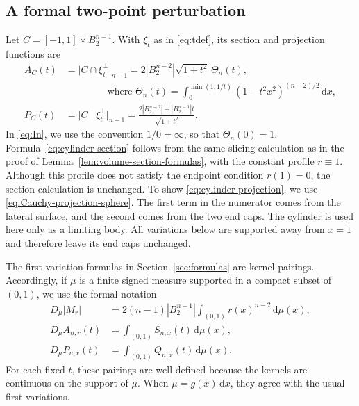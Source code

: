 \documentclass[11pt]{article}
\theoremstyle{remark}
\newcommand{\dd}{\,\mathrm{d}}
\begin{document}
\subsection{A formal two-point perturbation}
Let $
 C=[-1,1]\times B_2^{n-1}$.
With $\xi_t$ as in \eqref{eq:tdef}, its section and
projection functions are
\begin{align}
 A_C(t)&=\bigl|C\cap\xi_t^\perp\bigr|_{n-1}=2|B_2^{n-2}|\sqrt{1+t^2}\,\Theta_n(t),
 \label{eq:cylinder-section}\\
&\qquad\qquad\mbox{  where } \Theta_n(t)=\int_0^{\min(1,1/t)}
 (1-t^2x^2)^{(n-2)/2}\dd x,
 \label{eq:In}\\
 P_C(t)&=\bigl|C\mid\xi_t^\perp\bigr|_{n-1}=\frac{2|B_2^{n-2}|
                 +|B_2^{n-1}|t}{\sqrt{1+t^2}}.
 \label{eq:cylinder-projection}
\end{align}
In \eqref{eq:In}, we use the convention $1/0=\infty$, so that
$\Theta_n(0)=1$.
Formula~\eqref{eq:cylinder-section} follows from the same slicing calculation
as in the proof of Lemma~\ref{lem:volume-section-formulas}, with the constant
profile $r\equiv1$.  Although this profile does not satisfy the endpoint
condition $r(1)=0$, the section calculation is unchanged.
To show  \eqref{eq:cylinder-projection}, we use \eqref{eq:Cauchy-projection-sphere}. The first term in the
numerator comes from the lateral surface, and the second comes from
the two end caps.  The cylinder
is used here only as a limiting body.  All variations below are supported
away from $x=1$ and therefore leave its end caps unchanged.

The first-variation formulas in Section~\ref{sec:formulas} are kernel
pairings.  Accordingly, if $\mu$ is a finite signed measure supported in
a compact subset of $(0,1)$, we use the formal notation
\begin{align*}
 D_\mu|M_r|
 &={}2(n-1)|B_2^{n-1}|
   \int_{(0,1)}r(x)^{n-2}\dd\mu(x),\\
 D_\mu A_{n,r}(t)
 &={}\int_{(0,1)}S_{n,x}(t)\dd\mu(x),\\
 D_\mu P_{n,r}(t)
 &={}\int_{(0,1)}Q_{n,x}(t)\dd\mu(x).
\end{align*}
For each fixed $t$, these pairings are well defined because the kernels are
continuous on the support of $\mu$.  When $\mu=g(x)\dd x$, they agree with
the usual first variations.
\end{document}
